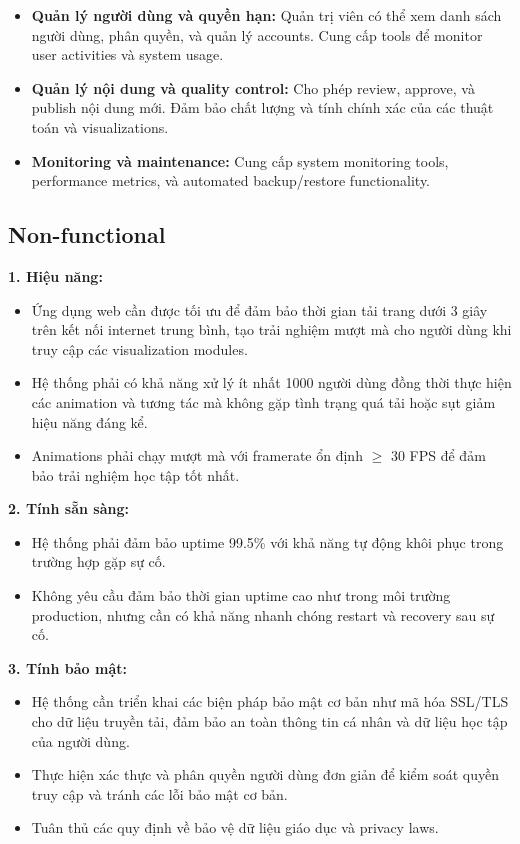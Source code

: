 \begin{itemize}
\item \textbf{Quản lý người dùng và quyền hạn:} Quản trị viên có thể xem danh sách người dùng, phân quyền, và quản lý accounts. Cung cấp tools để monitor user activities và system usage.

\item \textbf{Quản lý nội dung và quality control:} Cho phép review, approve, và publish nội dung mới. Đảm bảo chất lượng và tính chính xác của các thuật toán và visualizations.

\item \textbf{Monitoring và maintenance:} Cung cấp system monitoring tools, performance metrics, và automated backup/restore functionality.
\end{itemize}

\subsection{Non-functional}
\label{subsec:non-functional-req}

\textbf{1. Hiệu năng:}
\begin{itemize}
\item Ứng dụng web cần được tối ưu để đảm bảo thời gian tải trang dưới 3 giây trên kết nối internet trung bình, tạo trải nghiệm mượt mà cho người dùng khi truy cập các visualization modules.
\item Hệ thống phải có khả năng xử lý ít nhất 1000 người dùng đồng thời thực hiện các animation và tương tác mà không gặp tình trạng quá tải hoặc sụt giảm hiệu năng đáng kể.
\item Animations phải chạy mượt mà với framerate ổn định $\geq$ 30 FPS để đảm bảo trải nghiệm học tập tốt nhất.
\end{itemize}

\textbf{2. Tính sẵn sàng:}
\begin{itemize}
\item Hệ thống phải đảm bảo uptime 99.5\% với khả năng tự động khôi phục trong trường hợp gặp sự cố.
\item Không yêu cầu đảm bảo thời gian uptime cao như trong môi trường production, nhưng cần có khả năng nhanh chóng restart và recovery sau sự cố.
\end{itemize}

\textbf{3. Tính bảo mật:}
\begin{itemize}
\item Hệ thống cần triển khai các biện pháp bảo mật cơ bản như mã hóa SSL/TLS cho dữ liệu truyền tải, đảm bảo an toàn thông tin cá nhân và dữ liệu học tập của người dùng.
\item Thực hiện xác thực và phân quyền người dùng đơn giản để kiểm soát quyền truy cập và tránh các lỗi bảo mật cơ bản.
\item Tuân thủ các quy định về bảo vệ dữ liệu giáo dục và privacy laws.
\end{itemize}

